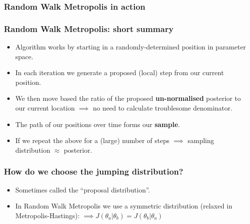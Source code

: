 \documentclass[handout]{beamer}
\begin{document}
\begin{frame}
\frametitle{Random Walk Metropolis in action}

\begin{figure}[t]
\centerline{}
\end{figure}

\end{frame}

\begin{frame}
\frametitle{Random Walk Metropolis: short summary}

\begin{itemize}
\item<2-> Algorithm works by starting in a randomly-determined position in parameter space.
\item<3-> In each iteration we generate a proposed (local) step from our current position.
\item<4-> We then move based the ratio of the proposed \textbf{un-normalised} posterior to our current location $\implies$ no need to calculate troublesome denominator.
\item<5-> The path of our positions over time forms our \textbf{sample}.
\item<6-> If we repeat the above for a (large) number of steps $\implies$ sampling distribution $\approx$ posterior.
\end{itemize}

\end{frame}

\begin{frame}
\frametitle{How do we choose the jumping distribution?}

\begin{itemize}
\item<2-> Sometimes called the ``proposal distribution''.
\item<3-> In Random Walk Metropolis we use a symmetric distribution (relaxed in Metropolis-Hastings):
 $\implies J(\theta_a|\theta_b) = J(\theta_b|\theta_a)$
\end{itemize}


\end{frame}
\end{document}
